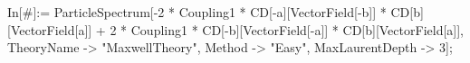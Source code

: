 In[\#]:= ParticleSpectrum[-2 * Coupling1 * CD[-a][VectorField[-b]] * CD[b][VectorField[a]] + 2 * Coupling1 * CD[-b][VectorField[-a]] * CD[b][VectorField[a]], TheoryName -> "MaxwellTheory", Method -> "Easy", MaxLaurentDepth -> 3]; 